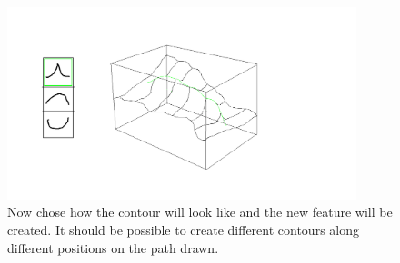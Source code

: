 \documentclass[12pt,a4paper]{article}
\begin{document}
\begin{figure}
\centering
\includegraphics[width=4in]{createRidge1}
\caption[]{
  \footnotesize
  Now chose how the contour will look like and the new feature will be created. It should be possible to create different contours along different positions on the path drawn. 
  \label{fig:createRidge1}
}
\end{figure}
\end{document}
